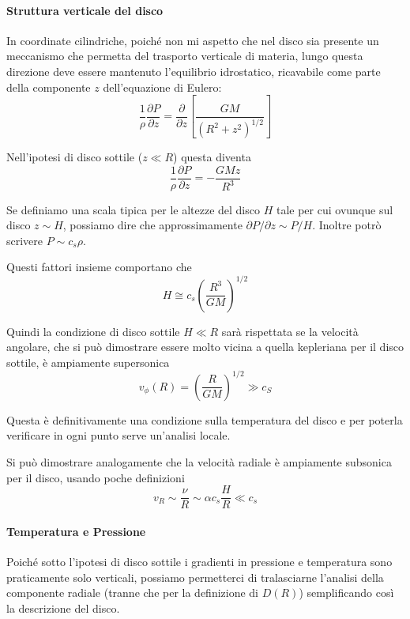 \documentclass[a4paperbi]{article}
\begin{document}
	\paragraph{Struttura verticale del disco}
	In coordinate cilindriche, poiché non mi aspetto che nel disco sia presente un meccanismo che permetta del trasporto verticale di materia, lungo questa direzione deve essere mantenuto l'equilibrio idrostatico, ricavabile come parte della componente $z$ dell'equazione di Eulero:
	\begin{equation*}
		\frac{1}{\rho}\frac{\partial P}{\partial z}=\frac{\partial}{\partial z}\left[\frac{GM}{(R^2+z^2)^{1/2}}\right]
	\end{equation*}
	
	Nell'ipotesi di disco sottile ($z\ll R$) questa diventa
	\begin{equation}
		\frac{1}{\rho}\frac{\partial P}{\partial z}=-\frac{GMz}{R^3}
	\end{equation}
	
	Se definiamo una scala tipica per le altezze del disco $H$ tale per cui ovunque sul disco $z\sim H$, possiamo dire che approssimamente $\partial P/\partial z\sim P/H$. Inoltre potrò scrivere $P\sim c_s\rho$.

	Questi fattori insieme comportano che
	\begin{equation}
		H\cong c_s\left(\frac{R^3}{GM}\right)^{1/2}
	\end{equation}

	Quindi la condizione di disco sottile $H\ll R$ sarà rispettata se la velocità angolare, che si può dimostrare essere molto vicina a quella kepleriana per il disco sottile, è ampiamente supersonica
	\begin{equation}
		v_\phi(R)=\left(\frac{R}{GM}\right)^{1/2}\gg c_S
	\end{equation}

	Questa è definitivamente una condizione sulla temperatura del disco e per poterla verificare in ogni punto serve un'analisi locale.
	
	Si può dimostrare analogamente che la velocità radiale è ampiamente subsonica per il disco, usando poche definizioni
	\begin{equation}
		v_R\sim\frac{\nu}{R}\sim\alpha c_s\frac{H}{R}\ll c_s
	\end{equation}
	
	\paragraph{Temperatura e Pressione} Poiché sotto l'ipotesi di disco sottile i gradienti in pressione e temperatura sono praticamente solo verticali, possiamo permetterci di tralasciarne l'analisi della componente radiale (tranne che per la definizione di $D(R)$) semplificando così la descrizione del disco.
	
\end{document}
